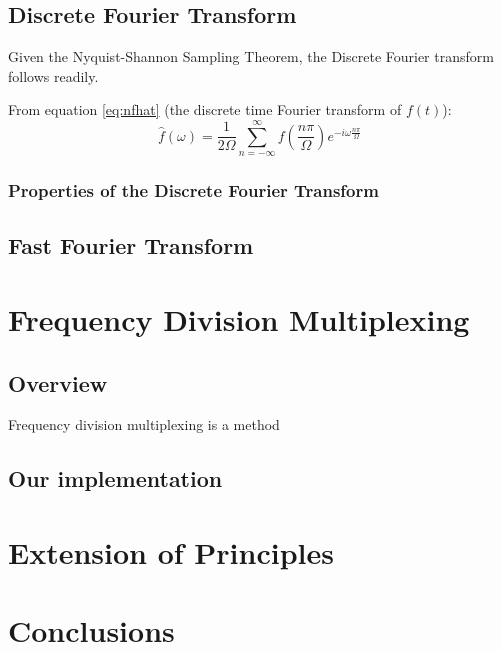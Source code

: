 \documentclass[12pt]{article}
\begin{document}

\subsection{Discrete Fourier Transform}

Given the Nyquist-Shannon Sampling Theorem, the Discrete Fourier transform follows readily.

From equation \eqref{eq:nfhat} (the discrete time Fourier transform of \(f(t)\)):
\[
\hat{f}(\omega) = \frac{1}{2\Omega} \sum_{n = -\infty}^{\infty} f(\frac{n\pi}{\Omega})e^{-i \omega \frac{n \pi}{\Omega} } 
\]


\subsubsection{Properties of the Discrete Fourier Transform}

\subsection{Fast Fourier Transform}

\section{Frequency Division Multiplexing}

\subsection{Overview}

Frequency division multiplexing is a method 

\subsection{Our implementation}


\section{Extension of Principles}


\section{Conclusions}
\end{document}
